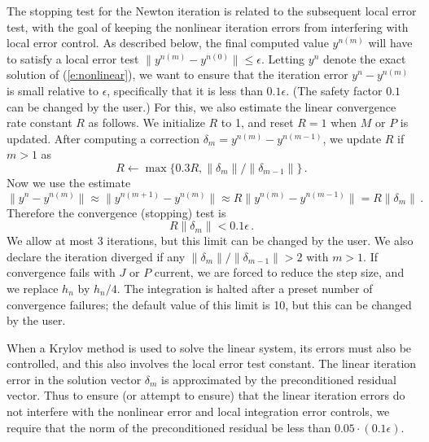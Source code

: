 The stopping test for the Newton iteration is related to the
subsequent local error test, with the goal of keeping the nonlinear
iteration errors from interfering with local error control.  As
described below, the final computed value $y^{n(m)}$ will have to
satisfy a local error test $\|y^{n(m)} - y^{n(0)}\| \leq \epsilon$.
Letting $y^n$ denote the exact solution of (\ref{e:nonlinear}), we want
to ensure that the iteration error $y^n - y^{n(m)}$ is small relative
to $\epsilon$, specifically that it is less than $0.1 \epsilon$.
(The safety factor $0.1$ can be changed by the user.)  For this, we
also estimate the linear convergence rate constant $R$ as follows.
We initialize $R$ to 1, and reset $R = 1$ when $M$ or $P$ is updated.
After computing a correction $\delta_m = y^{n(m)}-y^{n(m-1)}$, we
update $R$ if $m > 1$ as
\begin{equation*}
  R \leftarrow \max\{0.3R , \|\delta_m\| / \|\delta_{m-1}\| \} \, . 
\end{equation*}
Now we use the estimate
\begin{equation*}
  \| y^n - y^{n(m)} \| \approx \| y^{n(m+1)} - y^{n(m)} \| 
  \approx R \| y^{n(m)} - y^{n(m-1)} \|  =  R \|\delta_m \| \, . 
\end{equation*}
Therefore the convergence (stopping) test is 
\begin{equation*}
  R \|\delta_m \| < 0.1 \epsilon \, .
\end{equation*}
We allow at most 3 iterations, but this limit can be changed by the
user.  We also declare the iteration diverged if any $\|\delta_m\| /
\|\delta_{m-1}\| > 2$ with $m > 1$. If convergence fails with $J$ or
$P$ current, we are forced to reduce the step size, and we replace
$h_n$ by $h_n/4$.  The integration is halted after a preset number
of convergence failures; the default value of this limit is 10, 
but this can be changed by the user.

When a Krylov method is used to solve the linear system, its errors must also
be controlled, and this also involves the local error test constant.  The
linear iteration error in the solution vector $\delta_m$ is
approximated by the preconditioned residual vector.  Thus to ensure
(or attempt to ensure) that the linear iteration errors do not
interfere with the nonlinear error and local integration error
controls, we require that the norm of the preconditioned residual
be less than $0.05 \cdot (0.1 \epsilon)$.

